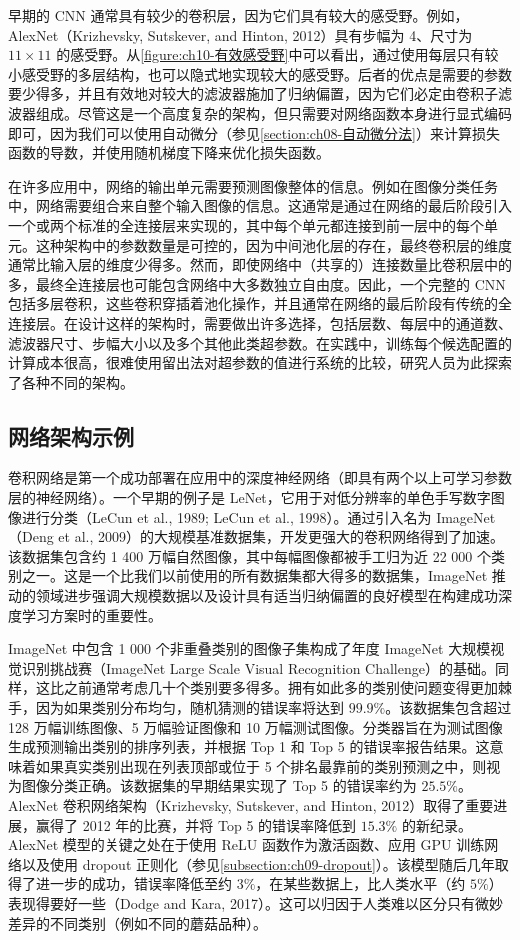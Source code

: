 \documentclass[../../main.tex]{subfiles}
\begin{document}
早期的 CNN 通常具有较少的卷积层，因为它们具有较大的感受野。例如，AlexNet（Krizhevsky, Sutskever, and Hinton, 2012）具有步幅为 4、尺寸为 $11\times 11$ 的感受野。从\cref{figure:ch10-有效感受野}中可以看出，通过使用每层只有较小感受野的多层结构，也可以隐式地实现较大的感受野。后者的优点是需要的参数要少得多，并且有效地对较大的滤波器施加了归纳偏置，因为它们必定由卷积子滤波器组成。尽管这是一个高度复杂的架构，但只需要对网络函数本身进行显式编码即可，因为我们可以使用自动微分（参见\cref{section:ch08-自动微分法}）来计算损失函数的导数，并使用随机梯度下降来优化损失函数。

在许多应用中，网络的输出单元需要预测图像整体的信息。例如在图像分类任务中，网络需要组合来自整个输入图像的信息。这通常是通过在网络的最后阶段引入一个或两个标准的全连接层来实现的，其中每个单元都连接到前一层中的每个单元。这种架构中的参数数量是可控的，因为中间池化层的存在，最终卷积层的维度通常比输入层的维度少得多。然而，即使网络中（共享的）连接数量比卷积层中的多，最终全连接层也可能包含网络中大多数独立自由度。因此，一个完整的 CNN 包括多层卷积，这些卷积穿插着池化操作，并且通常在网络的最后阶段有传统的全连接层。在设计这样的架构时，需要做出许多选择，包括层数、每层中的通道数、滤波器尺寸、步幅大小以及多个其他此类超参数。在实践中，训练每个候选配置的计算成本很高，很难使用留出法对超参数的值进行系统的比较，研究人员为此探索了各种不同的架构。

\subsection{网络架构示例}\label{subsection:ch10-网络架构示例}

卷积网络是第一个成功部署在应用中的深度神经网络（即具有两个以上可学习参数层的神经网络）。一个早期的例子是 LeNet，它用于对低分辨率的单色手写数字图像进行分类（LeCun et al., 1989; LeCun et al., 1998）。通过引入名为 ImageNet（Deng et al., 2009）的大规模基准数据集，开发更强大的卷积网络得到了加速。该数据集包含约 1 400 万幅自然图像，其中每幅图像都被手工归为近 22 000 个类别之一。这是一个比我们以前使用的所有数据集都大得多的数据集，ImageNet 推动的领域进步强调大规模数据以及设计具有适当归纳偏置的良好模型在构建成功深度学习方案时的重要性。

ImageNet 中包含 1 000 个非重叠类别的图像子集构成了年度 ImageNet 大规模视觉识别挑战赛（ImageNet Large Scale Visual Recognition Challenge）的基础。同样，这比之前通常考虑几十个类别要多得多。拥有如此多的类别使问题变得更加棘手，因为如果类别分布均匀，随机猜测的错误率将达到 $99.9\%$。该数据集包含超过 128 万幅训练图像、5 万幅验证图像和 10 万幅测试图像。分类器旨在为测试图像生成预测输出类别的排序列表，并根据 Top 1 和 Top 5 的错误率报告结果。这意味着如果真实类别出现在列表顶部或位于 5 个排名最靠前的类别预测之中，则视为图像分类正确。该数据集的早期结果实现了 Top 5 的错误率约为 $25.5\%$。AlexNet 卷积网络架构（Krizhevsky, Sutskever, and Hinton, 2012）取得了重要进展，赢得了 2012 年的比赛，并将 Top 5 的错误率降低到 $15.3\%$ 的新纪录。AlexNet 模型的关键之处在于使用 ReLU 函数作为激活函数、应用 GPU 训练网络以及使用 dropout 正则化（参见\cref{subsection:ch09-dropout}）。该模型随后几年取得了进一步的成功，错误率降低至约 $3\%$，在某些数据上，比人类水平（约 $5\%$）表现得要好一些（Dodge and Kara, 2017）。这可以归因于人类难以区分只有微妙差异的不同类别（例如不同的蘑菇品种）。
\end{document}
